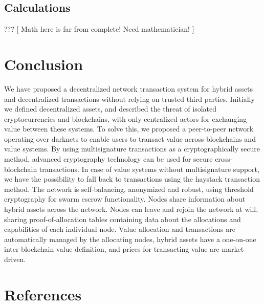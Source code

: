 \documentclass[a4paper]{article}
\begin{document}
\subsection{Calculations}

\begin{center}
	??? 	[ Math here is far from complete! Need mathematician! ]
\end{center}


\section{Conclusion}

We have proposed a decentralized network transaction system for hybrid assets and decentralized transactions without relying on trusted third parties. Initially we defined decentralized assets, and described the threat of isolated cryptocurrencies and blockchains, with only centralized actors for exchanging value between these systems. To solve this, we proposed a peer-to-peer network operating over darknets to enable users to transact value across blockchains and value systems. 
By using multisignature transactions as a cryptographically secure method, advanced cryptography technology can be used for secure cross-blockchain transactions. In case of value systems without multisignature support, we have the possibility to fall back to transactions using the haystack transaction method. The network is self-balancing, anonymized and robust, using threshold cryptography for swarm escrow functionality. Nodes share information about hybrid assets across the network. Nodes can leave and rejoin the network at will, sharing proof-of-allocation tables containing data about the allocations and capabilities of each individual node. Value allocation and transactions are automatically managed by the allocating nodes, hybrid assets have a one-on-one inter-blockchain value definition, and prices for transacting value are market driven.



\section{References}

{}

\end{document}
